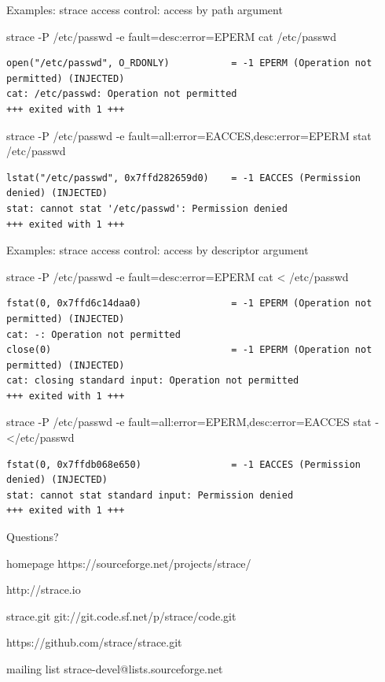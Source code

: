 \documentclass[unicode,aspectratio=169]{beamer}
\begin{document}
\begin{frame}[fragile]{Examples: strace access control: access by path argument}
\scriptsize
\begin{block}{\large strace -P /etc/passwd -e fault=desc:error=EPERM cat /etc/passwd}
\begin{verbatim}
open("/etc/passwd", O_RDONLY)           = -1 EPERM (Operation not permitted) (INJECTED)
cat: /etc/passwd: Operation not permitted
+++ exited with 1 +++
\end{verbatim}
\end{block}
\begin{block}{\large strace -P /etc/passwd -e fault=all:error=EACCES,desc:error=EPERM stat /etc/passwd}
\begin{verbatim}
lstat("/etc/passwd", 0x7ffd282659d0)    = -1 EACCES (Permission denied) (INJECTED)
stat: cannot stat '/etc/passwd': Permission denied
+++ exited with 1 +++
\end{verbatim}
\end{block}
\end{frame}

\begin{frame}[fragile]{Examples: strace access control: access by descriptor argument}
\scriptsize
\begin{block}{\large strace -P /etc/passwd -e fault=desc:error=EPERM cat < /etc/passwd}
\begin{verbatim}
fstat(0, 0x7ffd6c14daa0)                = -1 EPERM (Operation not permitted) (INJECTED)
cat: -: Operation not permitted
close(0)                                = -1 EPERM (Operation not permitted) (INJECTED)
cat: closing standard input: Operation not permitted
+++ exited with 1 +++
\end{verbatim}
\end{block}
\begin{block}{\large strace -P /etc/passwd -e fault=all:error=EPERM,desc:error=EACCES stat - </etc/passwd}
\begin{verbatim}
fstat(0, 0x7ffdb068e650)                = -1 EACCES (Permission denied) (INJECTED)
stat: cannot stat standard input: Permission denied
+++ exited with 1 +++
\end{verbatim}
\end{block}
\end{frame}

\begin{frame}{Questions?}
\begin{block}{\large homepage}
	https://sourceforge.net/projects/strace/

	http://strace.io
\end{block}
\begin{block}{\large strace.git}
	git://git.code.sf.net/p/strace/code.git

	https://github.com/strace/strace.git
\end{block}
\begin{block}{\large mailing list}
	strace-devel@lists.sourceforge.net
\end{block}
\end{frame}
\end{document}
